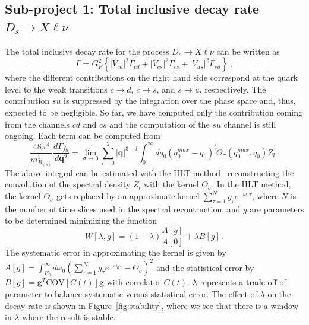 \documentclass [a4paper, 11pt]{article}
\begin{document}
\subsection{Sub-project 1: Total inclusive decay rate $D_s \to X\ell\nu$}

The total inclusive decay rate for the
process $D_s \to X\ell\nu$ can be written as
\begin{equation}
  \Gamma = G^2_F\left\{ |V_{cd} |^2 \Gamma_{cd} + |V_{cs} |^2 \Gamma_{cs} + |V_{us} |^2 \Gamma_{su}
  \right\}\,,
\end{equation}
where the different contributions on the right hand side correspond at the quark level to the weak
transitions $c \to d$, $c \to s$, and $s \to u$, respectively.
The contribution $su$ is suppressed by the integration over the phase
space and, thus, expected to be negligible. So far, we have computed only
the contribution coming from the channels $cd$ and $cs$ and the
computation of the $su$ channel is still ongoing.
Each term can be computed from
\begin{equation}
  \frac{48 \pi^4}{m_{B_{(s)}}^5}\frac{d\Gamma_{fg}}{d \bm{ q^2} }
  =\lim_{\sigma\to 0}\sum_{l=0}^2 |\bm{q}|^{3-l}\int_0^{\infty}d q_0 (q^{max}_0-q_0)^l\Theta_\sigma(q_0^{max},q_0) Z_l\,.
  \label{eq:gamma}
\end{equation}
The above integral can be estimated with the HLT method~\cite{Hansen:2019idp} reconstructing the
convolution of the spectral
density $Z_l$  with the kernel $\Theta_\sigma$.
In the HLT method, the kernel $\Theta_\sigma$ gets replaced by an
approximate kernel $\sum_{\tau=1}^Ng_\tau e^{-\omega_0\tau}$, where
$N$ is the number of time slices used in the spectral recontruction,
and $g$ are parameters to be determined minimizing the function 
\begin{equation}
  W[\lambda, g]=(1-\lambda)\frac{A[g]}{A[0]}+\lambda B[g]\,.
  \label{eq:W_HLT}
\end{equation}
The systematic error in approximating the kernel is given by
$A[g]=\int_{E_0}^\infty d \omega_0( \sum_{\tau=1}^N g_\tau e^{-\omega_0\tau}- \Theta_\sigma )^2$
and the statistical error by $B[g]=\bm{g}^T
\mbox{COV}[C(t)]\bm{g}$ with correlator $C(t)$. $\lambda$ represents a
trade-off of parameter to balance systematic versus statistical
error. The effect of $\lambda$ on the decay rate is shown in
Figure~\ref{fig:stability}, where we see that there is a window in
$\lambda$ where the result is stable. 
\end{document}
